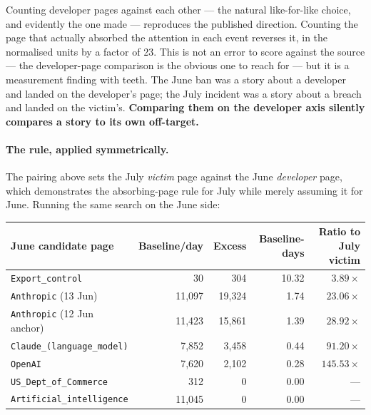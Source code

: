 \documentclass[11pt,a4paper]{article}
\begin{document}
Counting developer pages against each other --- the natural like-for-like
choice, and evidently the one made --- reproduces the published direction.
Counting the page that actually absorbed the attention in each event reverses
it, in the normalised units by a factor of 23. This is not an error to score
against the source --- the developer-page comparison is the obvious one to reach
for --- but it is a measurement finding with teeth. The June ban was a story
about a developer and landed on the developer's page; the July incident was a
story about a breach and landed on the victim's. \textbf{Comparing them on the
developer axis silently compares a story to its own off-target.}

\paragraph{The rule, applied symmetrically.} The pairing above sets the July
\emph{victim} page against the June \emph{developer} page, which demonstrates
the absorbing-page rule for July while merely assuming it for June. Running the
same search on the June side:

\begin{center}
\small
\begin{tabular}{lrrrr}
\toprule
June candidate page & Baseline/day & Excess & Baseline-days & Ratio to July victim \\\midrule
\texttt{Export\_control}         &     30 &    304 & 10.32 & $3.89\times$ \\
\texttt{Anthropic} (13 Jun)      & 11{,}097 & 19{,}324 &  1.74 & $23.06\times$ \\
\texttt{Anthropic} (12 Jun anchor) & 11{,}423 & 15{,}861 &  1.39 & $28.92\times$ \\
\texttt{Claude\_(language\_model)} &  7{,}852 &  3{,}458 &  0.44 & $91.20\times$ \\
\texttt{OpenAI}                  &  7{,}620 &  2{,}102 &  0.28 & $145.53\times$ \\
\texttt{US\_Dept\_of\_Commerce}    &    312 &      0 &  0.00 & --- \\
\texttt{Artificial\_intelligence} & 11{,}045 &      0 &  0.00 & --- \\
\bottomrule
\end{tabular}
\end{center}
\end{document}
